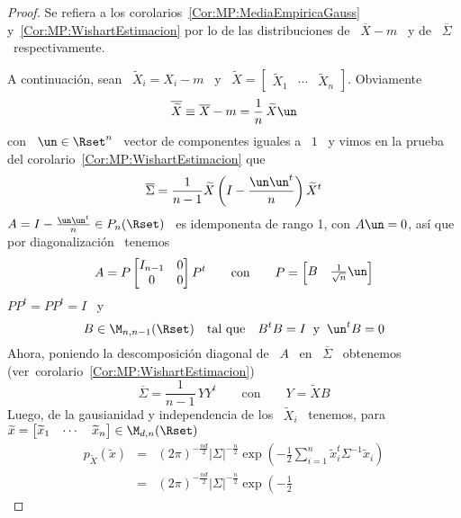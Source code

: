 \begin{proof}
  Se      refiera      a     los      corolarios~\ref{Cor:MP:MediaEmpiricaGauss}
  y~\ref{Cor:MP:WishartEstimacion}   por   lo  de   las   distribuciones  de   \
  $\overline{X}-m$ \ y de \ $\overline{\Sigma}$ \ respectivamente.

  A continuaci\'on,  sean \  $\widetilde{X}_i =  X_i - m$  \ y  \ $\widetilde{X}
  =        \begin{bmatrix}        \widetilde{X}_1        &       \cdots        &
    \widetilde{X}_n \end{bmatrix}$. Obviamente
  \[
  \overline{\widetilde{X}} \equiv \overline{X} - m = \frac{1}{n} \, \widetilde{X} \un
  \]
  con \ $\un \in  \Rset^n$ \ vector de componentes iguales a \  $1$ \ y vimos en
  la prueba del corolario~\ref{Cor:MP:WishartEstimacion} que
  \[
  \overline{\Sigma} = \frac{1}{n-1} \widetilde{X} \left( I - \frac{\un \un^t}{n}
  \right) \widetilde{X}^t
  \]
  $A = I - \frac{\un \un^t}{n} \in  P_n(\Rset)$ \ es idemponenta de rango 1, con
  $A  \un = 0$,  as\'i que  por diagonalizaci\'on~\cite{HorJoh13,  Bat97, Bat07}
  tenemos
  \[
  A = P \begin{bmatrix} I_{n-1} & 0\\ 0 & 0 \end{bmatrix} P^t \qquad \mbox{con} \qquad
  P = \begin{bmatrix} B & \frac{1}{\sqrt{n}} \un \end{bmatrix}
  \]
  $P P^t = P P^t = I$ \ y
  \[
  B \in \M_{n,n-1}(\Rset) \quad \mbox{tal que} \quad  B^t B = I \: \mbox{ y } \:
  \un^t B = 0
  \]
  Ahora,   poniendo   la  descomposici\'on   diagonal   de   \   $A$  \   en   \
  $\overline{\Sigma}$ \ obtenemos (ver~corolario~\ref{Cor:MP:WishartEstimacion})
  \[
  \overline{\Sigma} = \frac{1}{n-1} \, Y Y^t \qquad \mbox{con} \qquad Y = \widetilde{X} B
  \]
  Luego, de la gausianidad y independencia de los \ $\widetilde{X}_i$ \ tenemos,
  para \   $\widetilde{x}   =    \begin{bmatrix}   \widetilde{x}_1   &   \cdots   &
    \widetilde{x}_n \end{bmatrix} \in \M_{d,n}(\Rset)$
  \begin{eqnarray*}
  p_{\widetilde{X}}(\widetilde{x}) & = & (2 \pi)^{-\frac{n d}{2}}
  |\Sigma|^{-\frac{n}{2}} \exp\left(- \frac12 \sum_{i=1}^n \widetilde{x}_i^t
  \Sigma^{-1} \widetilde{x}_i \right)\\[2mm]
  & = & (2 \pi)^{-\frac{n d}{2}} |\Sigma|^{-\frac{n}{2}} \exp\left(- \frac12

\end{eqnarray*}
\end{proof}
